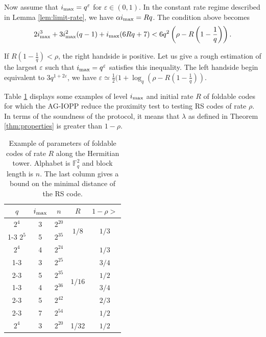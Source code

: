 \documentclass[10pt,a4paper]{article}
\renewcommand\epsilon{\varepsilon}
\newcommand\F{\mathbb{F}}
\newcommand{\ii}{i_{\rm{max}}}
\theoremstyle{plain}
\theoremstyle{plain}
\theoremstyle{definition}
\theoremstyle{remark}
\theoremstyle{plain}
\begin{document}
Now assume that $\ii=q^{\varepsilon}$ for $\varepsilon \in (0,1)$. In the constant rate regime described in Lemma \ref{lem:limit-rate}, we have $\alpha \ii = Rq$. The condition above becomes 
\[2\ii^3 + 3\ii^2(q-1) + \ii(6Rq+7)< 6q^2\left(\rho-R\left(1-\frac{1}{q}\right)\right) .\]

If $R\left(1-\frac{1}{q}\right) < \rho$, the right handside is positive. Let us give a rough estimation of the largest $\epsilon$ such that $\ii=q^\epsilon$ satisfies this inequality. The left handside begin equivalent to $3q^{1+2\epsilon}$, we have $\epsilon \simeq \frac{1}{2}(1+\log_q\left(\rho-R\left(1-\frac{1}{q}\right)\right)$.

Table \ref{table:param-HT} displays some examples of level $\ii$ and initial rate $R$ of foldable codes for which the AG-IOPP reduce the proximity test to testing RS codes of rate $\rho$. In terms of the soundness of the protocol, it means that $\lambda$ as defined in Theorem \ref{thm:properties} is greater than $1-\rho$.


\begin{table}[H]
	\centering
	\renewcommand{\arraystretch}{1.2}
	\begin{tabular}{|c|c|c|c|c|}
		\hline
		$q$      & $\ii$ & $n$  & $R$    & $1-\rho>$   \\\hline
		$2^4$      & 3  & $2^{20}$ & \multirow{2}{*}{$1/8$} & \multirow{2}{*}{$1/3$} \\ \cline{1-3}
		$2^5$      & 5  & $2^{35}$ &         &          \\\hline
		$2^4$      & 4  & $2^{24}$ & \multirow{6}{*}{$1/16$} & $1/3$ \\ \cline{1-3} \cline{5-5}
		\multirow{2}{*}{$2^5$}  & 3  & $2^{25}$ &  & $3/4$ \\ \cline{2-3} \cline{5-5}
		& 5  & $2^{35}$ &  & $1/2$ \\ \cline{1-3} \cline{5-5}
		\multirow{3}{*}{$2^6$}      & 4  & $2^{36}$ &  & $3/4$ \\ \cline{2-3} \cline{5-5}
		& 5  & $2^{42}$ &  & $2/3$ \\ \cline{2-3} \cline{5-5}
		& 7  & $2^{54}$ &  & $1/2$ \\ \hline
		$2^4$      & 3  & $2^{20}$ & 1/32 & $1/2$ \\ \hline
	\end{tabular}
	\renewcommand{\arraystretch}{1}
	\caption{Example of parameters of foldable codes of rate $R$ along the Hermitian tower. Alphabet is $\F_q^2$ and block length is $n$. The last column gives a bound on the minimal distance of the RS code.}\label{table:param-HT}
\end{table}
\end{document}
